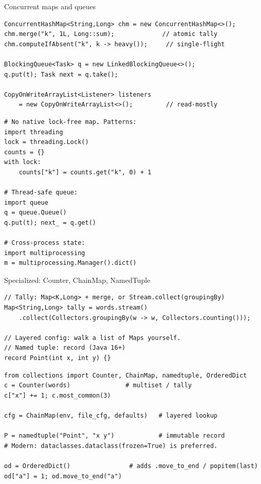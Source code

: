 \documentclass[10pt]{article}
\begin{document}
\begin{construct}{Concurrent maps and queues}
\noindent
\begin{minipage}[t]{0.485\linewidth}
\begin{lstlisting}[style=java, title=Java]
ConcurrentHashMap<String,Long> chm = new ConcurrentHashMap<>();
chm.merge("k", 1L, Long::sum);             // atomic tally
chm.computeIfAbsent("k", k -> heavy());     // single-flight

BlockingQueue<Task> q = new LinkedBlockingQueue<>();
q.put(t); Task next = q.take();

CopyOnWriteArrayList<Listener> listeners
    = new CopyOnWriteArrayList<>();         // read-mostly
\end{lstlisting}
\end{minipage}\hfill
\begin{minipage}[t]{0.485\linewidth}
\begin{lstlisting}[style=python, title=Python]
# No native lock-free map. Patterns:
import threading
lock = threading.Lock()
counts = {}
with lock:
    counts["k"] = counts.get("k", 0) + 1

# Thread-safe queue:
import queue
q = queue.Queue()
q.put(t); next_ = q.get()

# Cross-process state:
import multiprocessing
m = multiprocessing.Manager().dict()
\end{lstlisting}
\end{minipage}
\end{construct}

\begin{construct}{Specialized: Counter, ChainMap, NamedTuple}
\noindent
\begin{minipage}[t]{0.485\linewidth}
\begin{lstlisting}[style=java, title=Java]
// Tally: Map<K,Long> + merge, or Stream.collect(groupingBy)
Map<String,Long> tally = words.stream()
    .collect(Collectors.groupingBy(w -> w, Collectors.counting()));

// Layered config: walk a list of Maps yourself.
// Named tuple: record (Java 16+)
record Point(int x, int y) {}
\end{lstlisting}
\end{minipage}\hfill
\begin{minipage}[t]{0.485\linewidth}
\begin{lstlisting}[style=python, title=Python]
from collections import Counter, ChainMap, namedtuple, OrderedDict
c = Counter(words)               # multiset / tally
c["x"] += 1; c.most_common(3)

cfg = ChainMap(env, file_cfg, defaults)   # layered lookup

P = namedtuple("Point", "x y")            # immutable record
# Modern: dataclasses.dataclass(frozen=True) is preferred.

od = OrderedDict()                # adds .move_to_end / popitem(last)
od["a"] = 1; od.move_to_end("a")
\end{lstlisting}
\end{minipage}
\end{construct}
\end{document}
